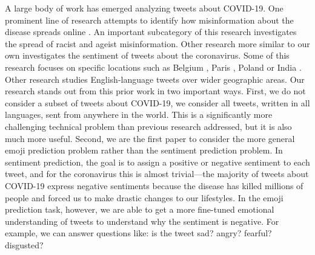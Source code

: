 \documentclass[11pt]{article}
\begin{document}

A large body of work has emerged analyzing tweets about COVID-19.
One prominent line of research attempts to identify how misinformation about the disease spreads online \citep{kouzy2020coronavirus,sharma2020coronavirus,yang2020prevalence,elhadad2020covid,prabhakar2020informational}.
An important subcategory of this research investigates the spread of racist \citep{budhwani2020creating,schild2020go} and ageist \citep{jimenez2020coronavirus} misinformation.
Other research more similar to our own investigates the sentiment of tweets about the coronavirus.
Some of this research focuses on specific locations such as Belgium \citep{kurten2020coronavirus}, Paris \citep{saire2020study}, Poland \citep{jarynowski2020perception} or India \citep{subasish2020}.
Other research studies English-language tweets \citep{rajput2020word,yin2020detecting} over wider geographic areas.
Our research stands out from this prior work in two important ways.
First, we do not consider a subset of tweets about COVID-19,
we consider all tweets, written in all languages, sent from anywhere in the world.
This is a significantly more challenging technical problem than previous research addressed,
but it is also much more useful.
Second, we are the first paper to consider the more general emoji prediction problem rather than the sentiment prediction problem.
In sentiment prediction,
the goal is to assign a positive or negative sentiment to each tweet,
and for the coronavirus this is almost trivial---the majority of tweets about COVID-19 express negative sentiments because the disease has killed millions of people and forced us to make drastic changes to our lifestyles.
In the emoji prediction task, however, we are able to get a more fine-tuned emotional understanding of tweets to understand why the sentiment is negative.
For example, we can answer questions like: is the tweet sad? angry? fearful? disgusted?
\end{document}
